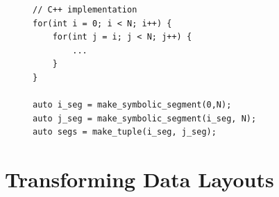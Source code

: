 \documentclass[sigconf,review=true]{acmart}
\begin{document}









\begin{figure}
	\begin{lstlisting}[caption={An example of a loop with a triangular iteration space, expressed in C++ and using our SymbolicSegments.},label={TriangularIterationSpace}]
// C++ implementation
for(int i = 0; i < N; i++) {
	for(int j = i; j < N; j++) {
		...
	}
}

auto i_seg = make_symbolic_segment(0,N);
auto j_seg = make_symbolic_segment(i_seg, N);
auto segs = make_tuple(i_seg, j_seg);

	\end{lstlisting}
\end{figure}

\section{Transforming Data Layouts}
\end{document}
